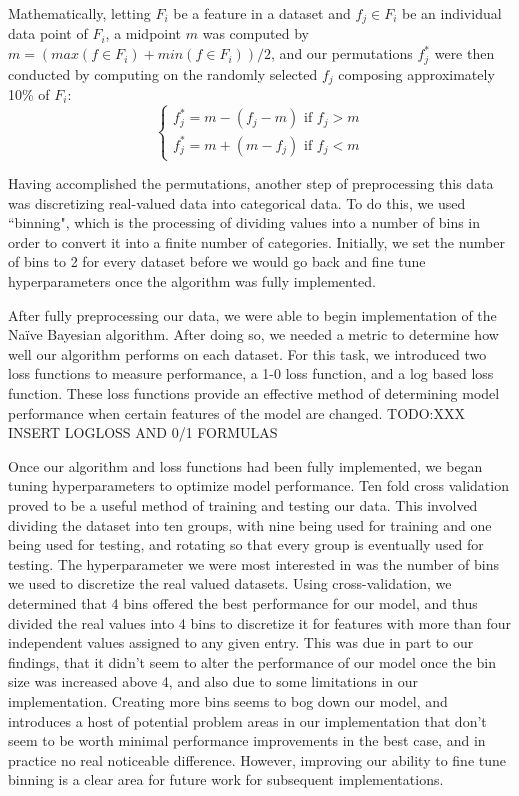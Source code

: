 \documentclass[twoside,11pt]{article}
\begin{document}
Mathematically, letting $F_i$ be a feature in a dataset and $f _j\in F_i$ be an individual data point of $F_i$, a midpoint $m$ was computed by
$m = (max(f \in F_i) + min(f \in F_i))/2$, and our permutations $f_j^*$ were then conducted by computing on the randomly selected $f_j$
composing approximately 10\% of $F_i$:
\[\begin{cases}
	f_j^*=m-(f_j-m) \text{ if $f_j > m$}\\
	f_j^*=m+(m-f_j) \text{ if $f_j < m$}
	\end{cases}\]
	
Having accomplished the permutations, another step of preprocessing this data was discretizing real-valued data into categorical data. To do this, we used ``binning", which is the processing of dividing values into a number of bins in order to convert it into a finite number of categories. Initially, we
set the number of bins to 2 for every dataset before we would go back and fine tune hyperparameters once the algorithm was fully implemented.

After fully preprocessing our data, we were able to begin implementation of the Na{\"i}ve Bayesian algorithm. After doing so, we needed a metric to determine how well our algorithm performs on each dataset. For this task, we introduced two loss functions to measure performance, a 1-0 loss function, and a log based loss function. These loss functions provide an effective method of determining model performance when certain features of the model are changed. TODO:XXX INSERT LOGLOSS AND 0/1 FORMULAS

Once our algorithm and loss functions had been fully implemented, we began tuning hyperparameters to optimize model performance. Ten fold cross validation proved to be a useful method of training and testing our data. This involved dividing the dataset into ten groups, with nine being used for training and one being used for testing, and rotating so that every group is eventually used for testing. The hyperparameter we were most interested in was the number of bins we used to discretize the real valued datasets. 
Using cross-validation, we determined that 4 bins offered the best performance for our model, and thus divided the real values into 4 bins to discretize it for features
with more than four independent values assigned to any given entry. This was due in part to our findings, that it didn't seem to alter the performance
of our model once the bin size was increased above 4, and also due to some limitations in our implementation. Creating more bins seems to bog down
our model, and introduces a host of potential problem areas in our implementation that don't seem to be worth minimal performance improvements in the best case, and in practice no real noticeable difference. However, improving our ability to fine tune binning is a clear area for future work for subsequent implementations.
 
\vskip 0.2in

\end{document}
